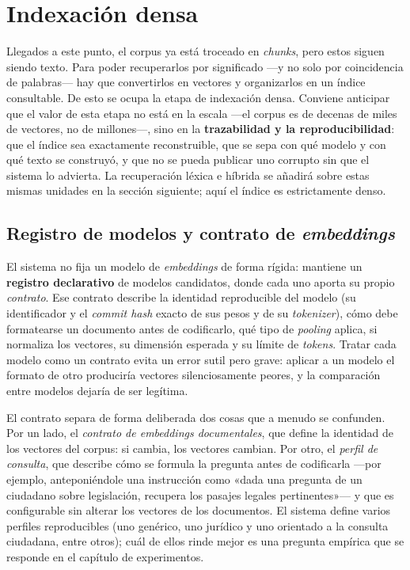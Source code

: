 \section{Indexación densa}
\label{sec:indexacion}

Llegados a este punto, el corpus ya está troceado en \emph{chunks}, pero estos siguen siendo texto. Para poder recuperarlos por significado —y no solo por coincidencia de palabras— hay que convertirlos en vectores y organizarlos en un índice consultable. De esto se ocupa la etapa de indexación densa. Conviene anticipar que el valor de esta etapa no está en la escala —el corpus es de decenas de miles de vectores, no de millones—, sino en la \textbf{trazabilidad y la reproducibilidad}: que el índice sea exactamente reconstruible, que se sepa con qué modelo y con qué texto se construyó, y que no se pueda publicar uno corrupto sin que el sistema lo advierta. La recuperación léxica e híbrida se añadirá sobre estas mismas unidades en la sección siguiente; aquí el índice es estrictamente denso.

\subsection{Registro de modelos y contrato de \emph{embeddings}}
\label{subsec:registro-modelos}

El sistema no fija un modelo de \emph{embeddings} de forma rígida: mantiene un \textbf{registro declarativo} de modelos candidatos, donde cada uno aporta su propio \emph{contrato}. Ese contrato describe la identidad reproducible del modelo (su identificador y el \emph{commit hash} exacto de sus pesos y de su \emph{tokenizer}), cómo debe formatearse un documento antes de codificarlo, qué tipo de \emph{pooling} aplica, si normaliza los vectores, su dimensión esperada y su límite de \emph{tokens}. Tratar cada modelo como un contrato evita un error sutil pero grave: aplicar a un modelo el formato de otro produciría vectores silenciosamente peores, y la comparación entre modelos dejaría de ser legítima.

El contrato separa de forma deliberada dos cosas que a menudo se confunden. Por un lado, el \emph{contrato de \emph{embeddings} documentales}, que define la identidad de los vectores del corpus: si cambia, los vectores cambian. Por otro, el \emph{perfil de consulta}, que describe cómo se formula la pregunta antes de codificarla —por ejemplo, anteponiéndole una instrucción como «dada una pregunta de un ciudadano sobre legislación, recupera los pasajes legales pertinentes»— y que es configurable sin alterar los vectores de los documentos. El sistema define varios perfiles reproducibles (uno genérico, uno jurídico y uno orientado a la consulta ciudadana, entre otros); cuál de ellos rinde mejor es una pregunta empírica que se responde en el capítulo de experimentos.

